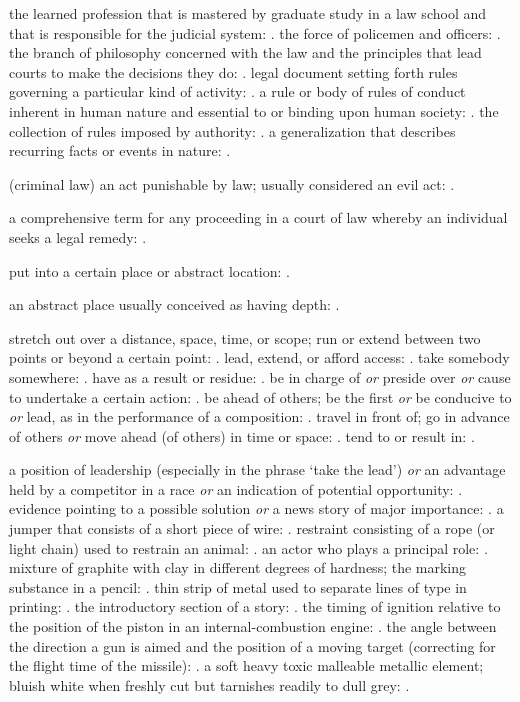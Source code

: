   the learned profession that is mastered by graduate study in a law school and that is responsible for the judicial system: . the force of policemen and officers: . the branch of philosophy concerned with the law and the principles that lead courts to make the decisions they do: . legal document setting forth rules governing a particular kind of activity: . a rule or body of rules of conduct inherent in human nature and essential to or binding upon human society: . the collection of rules imposed by authority: . a generalization that describes recurring facts or events in nature: .

  (criminal law) an act punishable by law; usually considered an evil act: .

  a comprehensive term for any proceeding in a court of law whereby an individual seeks a legal remedy: .

  put into a certain place or abstract location: .

  an abstract place usually conceived as having depth: .

  stretch out over a distance, space, time, or scope; run or extend between two points or beyond a certain point: . lead, extend, or afford access: . take somebody somewhere: . have as a result or residue: . be in charge of \textit{or} preside over \textit{or} cause to undertake a certain action: . be ahead of others; be the first \textit{or} be conducive to \textit{or} lead, as in the performance of a composition: . travel in front of; go in advance of others \textit{or} move ahead (of others) in time or space: . tend to or result in: .

  a position of leadership (especially in the phrase `take the lead') \textit{or} an advantage held by a competitor in a race \textit{or} an indication of potential opportunity: . evidence pointing to a possible solution \textit{or} a news story of major importance: . a jumper that consists of a short piece of wire: . restraint consisting of a rope (or light chain) used to restrain an animal: . an actor who plays a principal role: . mixture of graphite with clay in different degrees of hardness; the marking substance in a pencil: . thin strip of metal used to separate lines of type in printing: . the introductory section of a story: . the timing of ignition relative to the position of the piston in an internal-combustion engine: . the angle between the direction a gun is aimed and the position of a moving target (correcting for the flight time of the missile): . a soft heavy toxic malleable metallic element; bluish white when freshly cut but tarnishes readily to dull grey: .

